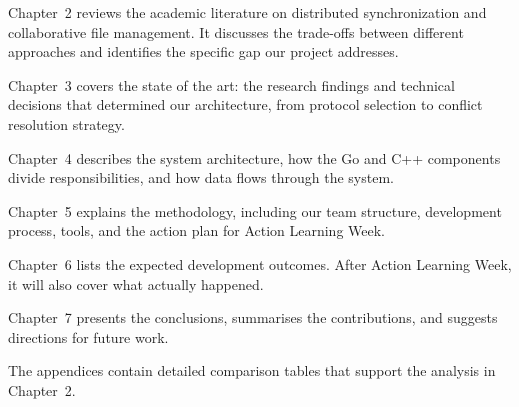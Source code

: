 Chapter~2 reviews the academic literature on distributed synchronization and collaborative file management. It discusses the trade-offs between different approaches and identifies the specific gap our project addresses.

Chapter~3 covers the state of the art: the research findings and technical decisions that determined our architecture, from protocol selection to conflict resolution strategy.

Chapter~4 describes the system architecture, how the Go and C++ components divide responsibilities, and how data flows through the system.

Chapter~5 explains the methodology, including our team structure, development process, tools, and the action plan for Action Learning Week.

Chapter~6 lists the expected development outcomes. After Action Learning Week, it will also cover what actually happened.

Chapter~7 presents the conclusions, summarises the contributions, and suggests directions for future work.

The appendices contain detailed comparison tables that support the analysis in Chapter~2.
